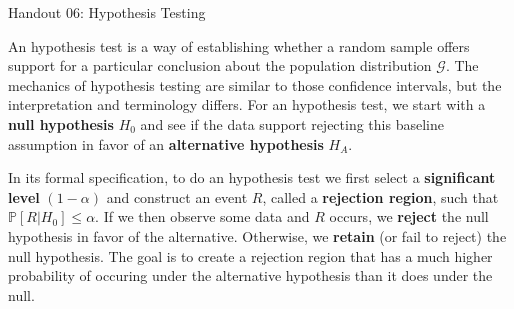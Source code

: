 \documentclass{tufte-handout}
\newcommand{\Prob}{\mathbb{P}}
\begin{document}
\justify

{\LARGE Handout 06: Hypothesis Testing}

\vspace*{18pt}

\noindent
An hypothesis test is a way of establishing whether a random sample
offers support for a particular conclusion about the population 
distribution $\mathcal{G}$. The mechanics of hypothesis testing are
similar to those confidence intervals, but the interpretation and
terminology differs. For an hypothesis test, we start with a
\textbf{null hypothesis} $H_0$ and see if the data support rejecting
this baseline assumption in favor of an \textbf{alternative hypothesis}
$H_A$. 

In its formal specification, to do an hypothesis test we first select
a \textbf{significant level} $(1-\alpha)$ and construct an event $R$,
called a \textbf{rejection region}, such that $\Prob[R | H_0] \leq \alpha$.
If we then observe some data and $R$ occurs, we \textbf{reject} the
null hypothesis in favor of the alternative. Otherwise, we \textbf{retain}
(or fail to reject) the null hypothesis. The goal is to create a rejection
region that has a much higher probability of occuring under the alternative
hypothesis than it does under the null.
\end{document}
